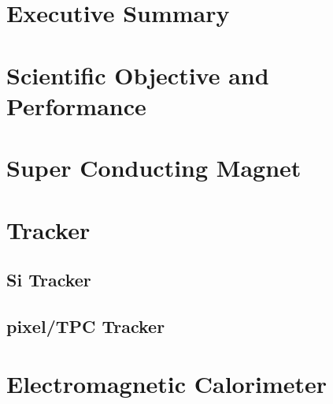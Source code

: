 \documentclass[12pt,twoside,notitlepage]{book}
\begin{document}
 
\frontmatter
\pagestyle{empty}



\cleardoublepage
\pagestyle{fancy}

\chapter*{Executive Summary}
\label{exec_summ}


\setcounter{page}{1}

\cleardoublepage

\resetlinenumber

\tableofcontents
\cleardoublepage

\mainmatter

\renewcommand{\thepage}{\arabic{page}}
\setcounter{chapter}{0}
\setcounter{page}{1}

\chapter{Scientific Objective and Performance}
\label{sci_obj_perf}

 
\chapter{Super Conducting Magnet}
\label{magnet}

 
\chapter{Tracker}
\label{tracker}

\section{Si Tracker}
\section{pixel/TPC Tracker}
 
\chapter{Electromagnetic Calorimeter}
\label{emcal}

 
\end{document}
